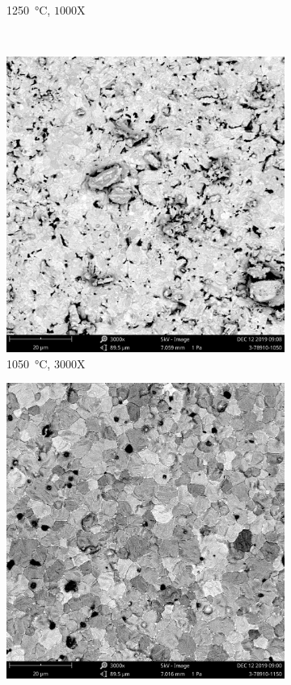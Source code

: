 \documentclass[UTF8,no-math]{ctexart}
\numberwithin{enumi}{section}
\begin{document}
\begin{enumerate}
\begin{figure}[htbp]
\begin{subfigure}[b]{0.27\textwidth}
                \caption{\SI{1250}{\celsius}, $1000\text{X}$}
            \end{subfigure}
            \\[10pt]
            \begin{subfigure}[b]{0.27\textwidth}
                \centering
                \includegraphics[width=0.9\linewidth]{fig/3-78910-10500002.jpg}
                \caption{\SI{1050}{\celsius}, $3000\text{X}$}
            \end{subfigure}
            \begin{subfigure}[b]{0.27\textwidth}
                \centering
                \includegraphics[width=0.9\linewidth]{fig/3-78910-11500002.jpg}

\end{subfigure}
\end{figure}
\end{enumerate}
\end{document}

